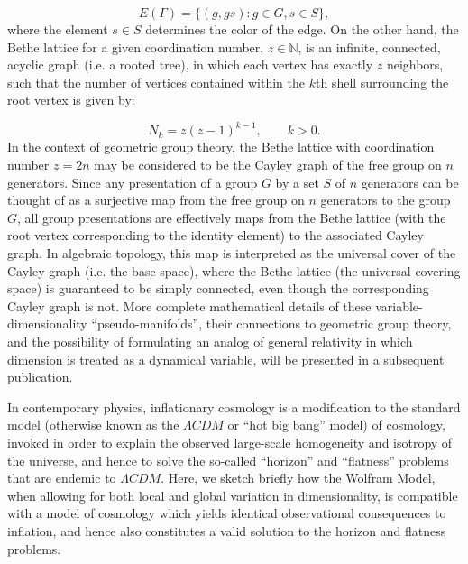 \documentclass{article}
\begin{document}
\begin{equation}
E \left( \Gamma \right) = \lbrace \left( g, g s \right) : g \in G, s \in S \rbrace,
\end{equation}
where the element ${s \in S}$ determines the color of the edge. On the other hand, the Bethe lattice for a given coordination number, ${z \in \mathbb{N}}$, is an infinite, connected, acyclic graph (i.e. a rooted tree), in which each vertex has exactly $z$ neighbors, such that the number of vertices contained within the $k$th shell surrounding the root vertex is given by:

\begin{equation}
N_k = z \left( z - 1 \right)^{k - 1}, \qquad k > 0.
\end{equation}
In the context of geometric group theory, the Bethe lattice with coordination number ${z = 2n}$ may be considered to be the Cayley graph of the free group on $n$ generators. Since any presentation of a group $G$ by a set $S$ of $n$ generators can be thought of as a surjective map from the free group on $n$ generators to the group $G$, all group presentations are effectively maps from the Bethe lattice (with the root vertex corresponding to the identity element) to the associated Cayley graph. In algebraic topology, this map is interpreted as the universal cover of the Cayley graph (i.e. the base space), where the Bethe lattice (the universal covering space) is guaranteed to be simply connected, even though the corresponding Cayley graph is not. More complete mathematical details of these variable-dimensionality ``pseudo-manifolds'', their connections to geometric group theory, and the possibility of formulating an analog of general relativity in which dimension is treated as a dynamical variable, will be presented in a subsequent publication.

In contemporary physics, inflationary cosmology is a modification to the standard model (otherwise known as the ${\Lambda CDM}$ or ``hot big bang'' model) of cosmology, invoked in order to explain the observed large-scale homogeneity and isotropy of the universe, and hence to solve the so-called ``horizon'' and ``flatness'' problems that are endemic to ${\Lambda CDM}$\cite{peacock}\cite{dicke}\cite{guth}\cite{fixsen}. Here, we sketch briefly how the Wolfram Model, when allowing for both local and global variation in dimensionality, is compatible with a model of cosmology which yields identical observational consequences to inflation, and hence also constitutes a valid solution to the horizon and flatness problems.
\end{document}
